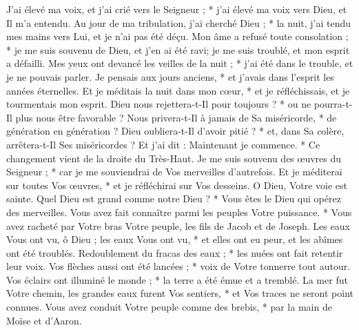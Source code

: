 J'ai élevé ma voix, et j'ai crié vers le Seigneur ; * j'ai élevé ma voix vers Dieu, et Il m'a entendu.
\versseparator
 Au jour de ma tribulation, j'ai cherché Dieu ; * la nuit, j'ai tendu mes mains vers Lui, et je n'ai pas été déçu.
\versseparator
 Mon âme a refusé toute consolation ; * je me suis souvenu de Dieu, et j'en ai été ravi; je me suis troublé, et mon esprit a défailli.
\versseparator
 Mes yeux ont devancé les veilles de la nuit ; * j'ai été dans le trouble, et je ne pouvais parler.
\versseparator
 Je pensais aux jours anciens, * et j'avais dans l'esprit les années éternelles.
\versseparator
 Et je méditais la nuit dans mon cœur, * et je réfléchissais, et je tourmentais mon esprit.
\versseparator
 Dieu nous rejettera-t-Il pour toujours ? * ou ne pourra-t-Il plus nous être favorable ?
\versseparator
 Nous privera-t-Il à jamais de Sa miséricorde, * de génération en génération ?
\versseparator
 Dieu oubliera-t-Il d'avoir pitié ? * et, dans Sa colère, arrêtera-t-Il Ses miséricordes ?
\versseparator
 Et j'ai dit : Maintenant je commence. * Ce changement vient de la droite du Très-Haut.
\versseparator
 Je me suis souvenu des œuvres du Seigneur ; * car je me souviendrai de Vos merveilles d'autrefois.
\versseparator
 Et je méditerai sur toutes Vos œuvres, * et je réfléchirai sur Vos desseins.
\versseparator
 O Dieu, Votre voie est sainte. Quel Dieu est grand comme notre Dieu ? * Vous êtes le Dieu qui opérez des merveilles.
\versseparator
 Vous avez fait connaître parmi les peuples Votre puissance. * Vous avez racheté par Votre bras Votre peuple, les fils de Jacob et de Joseph.
\versseparator
 Les eaux Vous ont vu, ô Dieu ; les eaux Vous ont vu, * et elles ont eu peur, et les abîmes ont été troublés.
\versseparator
 Redoublement du fracas des eaux ; * les nuées ont fait retentir leur voix.
\versseparator
 Vos flèches aussi ont été lancées ; * voix de Votre tonnerre tout autour.
\versseparator
 Vos éclairs ont illuminé le monde ; * la terre a été émue et a tremblé.
\versseparator
 La mer fut Votre chemin, les grandes eaux furent Vos sentiers, * et Vos traces ne seront point connues.
\versseparator
 Vous avez conduit Votre peuple comme des brebis, * par la main de Moïse et d'Aaron.